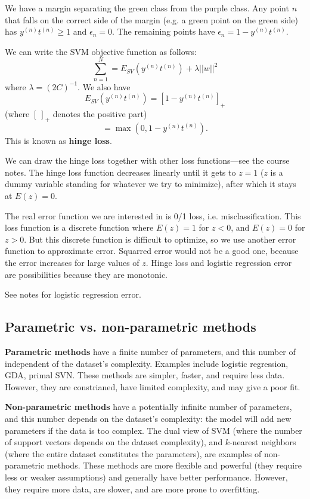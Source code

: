 \documentclass[a4paper,12pt]{article}
\begin{document}
We have a margin separating the green class from the purple class. Any point $n$ that falls on the correct side of the margin (e.g. a green point on the green side) has $y^{(n)}t^{(n)} \geq 1$ and $\epsilon_n = 0$. The remaining points have $\epsilon_n = 1 - y^{(n)}t^{(n)}$. 

We can write the SVM objective function as follows: 
$$\sum_{n=1}^N = E_{SV} (y^{(n)}t^{(n)}) + \lambda ||w||^2$$
where $\lambda= (2C)^{-1}$. We also have 
$$E_{SV}(y^{(n)}t^{(n)}) = [1 - y^{(n)}t^{(n)}]_+$$ 
(where $[~]_+$ denotes the positive part)
$$= \max (0, 1 - y^{(n)}t^{(n)}).$$
This is known as \textbf{hinge loss}. 

We can draw the hinge loss together with other loss functions---see the course notes. The hinge loss function decreases linearly until it gets to $z = 1$ ($z$ is a dummy variable standing for whatever we try to minimize), after which it stays at $E(z) = 0$. 

The real error function we are interested in is 0/1 loss, i.e. misclassification. This loss function is a discrete function where $E(z)=1$ for $z<0$, and $E(z)=0$ for $z>0$. But this discrete function is difficult to optimize, so we use another error function to approximate error.  Squarred error would not be a good one, because the error increases for large values of $z$. Hinge loss and logistic regression error are possibilities because they are monotonic. 

See notes for logistic regression error. 

\subsection{Parametric vs. non-parametric methods}

\textbf{Parametric methods} have a finite number of parameters, and this number of independent of the dataset's complexity. Examples include logistic regression, GDA, primal SVN. These methods are simpler, faster, and require less data. However, they are constrianed, have limited complexity, and may give a poor fit. 

\textbf{Non-parametric methods} have a potentially infinite number of parameters, and this number depends on the dataset's complexity: the model will add new parameters if the data is too complex. The dual view of SVM (where the number of support vectors depends on the dataset complexity), and $k$-nearest neighbors (where the entire dataset constitutes the parameters), are examples of non-parametric methods. These methods are more flexible and powerful (they require less or weaker assumptions) and generally have better performance. However, they require more data, are slower, and are more prone to overfitting. 
\end{document}
